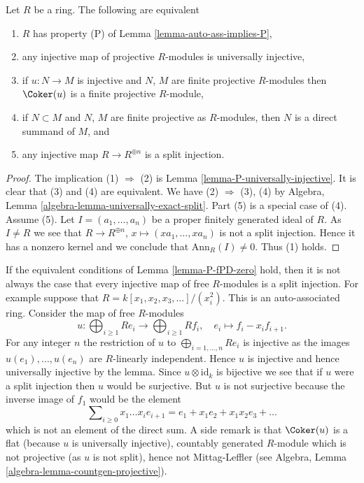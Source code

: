 \begin{lemma}
\label{lemma-P-fPD-zero}
Let $R$ be a ring. The following are equivalent
\begin{enumerate}
\item $R$ has property (P) of
Lemma \ref{lemma-auto-ass-implies-P},
\item any injective map of projective $R$-modules is
universally injective,
\item if $u : N \to M$ is injective and $N$, $M$ are finite projective
$R$-modules then $\Coker(u)$ is a finite projective $R$-module,
\item if $N \subset M$ and $N$, $M$ are finite projective as $R$-modules, then
$N$ is a direct summand of $M$, and
\item any injective map $R \to R^{\oplus n}$ is a split injection.
\end{enumerate}
\end{lemma}

\begin{proof}
The implication (1) $\Rightarrow$ (2) is
Lemma \ref{lemma-P-universally-injective}.
It is clear that (3) and (4) are equivalent.
We have (2) $\Rightarrow$ (3), (4) by
Algebra, Lemma \ref{algebra-lemma-universally-exact-split}.
Part (5) is a special case of (4).
Assume (5). Let $I = (a_1, \ldots, a_n)$ be a proper finitely generated
ideal of $R$. As $I \not = R$ we see that
$R \to R^{\oplus n}$, $x \mapsto (xa_1, \ldots, xa_n)$
is not a split injection. Hence it has a nonzero kernel and we conclude
that $\text{Ann}_R(I) \not = 0$. Thus (1) holds.
\end{proof}

\begin{example}
\label{example-auto-ass-weird-flat}
If the equivalent conditions of
Lemma \ref{lemma-P-fPD-zero}
hold, then it is not always the case that every injective map of
free $R$-modules is a split injection. For example suppose that
$R = k[x_1, x_2, x_3, \ldots]/(x_i^2)$. This is an auto-associated ring.
Consider the map of free $R$-modules
$$
u :
\bigoplus\nolimits_{i \geq 1} Re_i
\longrightarrow
\bigoplus\nolimits_{i \geq 1} Rf_i, \quad
e_i \longmapsto f_i - x_if_{i + 1}.
$$
For any integer $n$ the restriction of $u$ to
$\bigoplus_{i = 1, \ldots, n} Re_i$ is injective as the images
$u(e_1), \ldots, u(e_n)$ are $R$-linearly independent. Hence
$u$ is injective and hence universally injective by the lemma.
Since $u \otimes \text{id}_k$ is bijective we see that if
$u$ were a split injection then $u$ would be surjective. But $u$ is not
surjective because the inverse image of $f_1$ would be the element
$$
\sum\nolimits_{i \geq 0} x_1 \ldots x_ie_{i + 1} =
e_1 + x_1e_2 + x_1x_2e_3 + \ldots
$$
which is not an element of the direct sum. A side remark is that
$\Coker(u)$ is a flat (because $u$ is universally injective),
countably generated $R$-module which is not projective (as $u$ is not
split), hence not Mittag-Leffler (see
Algebra, Lemma \ref{algebra-lemma-countgen-projective}).
\end{example}









